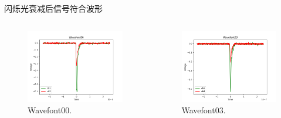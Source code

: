 \documentclass[10pt]{beamer}
\begin{document}
\begin{frame}[label={sec:orgecbe44e}]{闪烁光衰减后信号符合波形}
\begin{columns}
\begin{column}{0.5\columnwidth}
\begin{figure}[htbp]
\centering
\includegraphics[width=\textwidth]{../AttenuationLength/figs/Wavefont00.png}
\caption{Wavefont00.}
\end{figure}
\end{column}
\begin{column}{0.5\columnwidth}
\begin{figure}[htbp]
\centering
\includegraphics[width=\textwidth]{../AttenuationLength/figs/Wavefont03.png}
\caption{Wavefont03.}
\end{figure}
\end{column}
\end{columns}
\end{frame}
\end{document}
